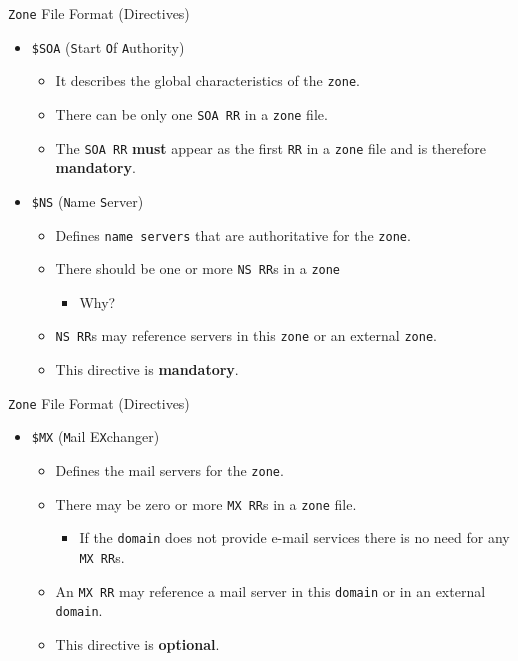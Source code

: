 \documentclass[xcolor=table]{beamer}
\begin{document}
\begin{frame}{\texttt{Zone} File Format (Directives)}
  \begin{itemize}
    \item \texttt{\$SOA} (\texttt{S}tart \texttt{O}f \texttt{A}uthority)
       \begin{itemize}
         \item It describes the global characteristics of the \texttt{zone}.
         \item There can be only one \texttt{SOA RR} in a \texttt{zone} file. 
         \item The \texttt{SOA RR} \textbf{must} appear as the first \texttt{RR} in a \texttt{zone} file and is therefore \textbf{mandatory}.
       \end{itemize}
     \item \texttt{\$NS} (\texttt{N}ame \texttt{S}erver)
       \begin{itemize}
         \item Defines \texttt{name servers} that are authoritative for the \texttt{zone}. 
         \item There should be one or more \texttt{NS RR}s in a \texttt{zone} 
           \begin{itemize}
             \item Why?
           \end{itemize} 
         \item \texttt{NS RR}s may reference servers in this \texttt{zone} or an external \texttt{zone}. 
         \item This directive is \textbf{mandatory}.
       \end{itemize}
  \end{itemize}
\end{frame}

\begin{frame}{\texttt{Zone} File Format (Directives)}
  \begin{itemize}
    \item \texttt{\$MX} (\texttt{M}ail E\texttt{X}changer)
       \begin{itemize}
          \item Defines the mail servers for the \texttt{zone}. 
          \item There may be zero or more \texttt{MX RR}s in a \texttt{zone} file.
            \begin{itemize}
              \item If the \texttt{domain} does not provide e-mail services there is no need for any \texttt{MX RR}s.
            \end{itemize} 
         \item An \texttt{MX RR} may reference a mail server in this \texttt{domain} or in an external \texttt{domain}. 
         \item This directive is \textbf{optional}.
       \end{itemize}
  \end{itemize}
\end{frame}
\end{document}
